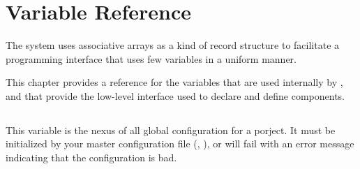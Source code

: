 %
%
%
%
\chapter{Variable Reference}\label{chap:variables}

The \lmsbw system uses associative arrays as a kind of record
structure to facilitate a programming interface that uses few
variables in a uniform manner.

This chapter provides a reference for the variables that are used
internally by \lmsbw, and that provide the low-level interface used to
declare and define components.

\begin{center}\end{center}

\section{\lmsbwconfiguration}\label{variables:lmsbw-configuration}

This variable is the nexus of all global configuration for a porject.
It must be initialized by your master configuration file
(, ), or
\lmsbw will fail with an error message indicating that the
configuration is bad.

